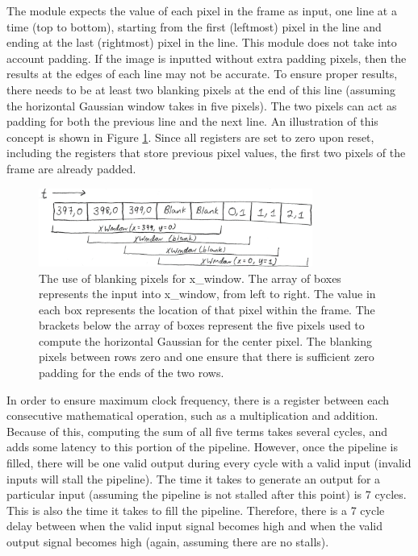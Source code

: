 The module expects the value of each pixel in the frame as input, one line at 
a time (top to bottom), starting from the first (leftmost) pixel in the line and 
ending at the last (rightmost) pixel in the line. This module does not take into 
account padding. If the image is inputted without extra padding pixels, then the 
results at the edges of each line may not be accurate. To ensure proper results, 
there needs to be at least two blanking pixels at the end of this line (assuming 
the horizontal Gaussian window takes in five pixels). The two pixels can act as 
padding for both the previous line and the next line. An illustration of this 
concept is shown in Figure \ref{fig:serial}. Since all registers are set to 
zero upon reset, including the registers that store previous pixel values, the 
first two pixels of the frame are already padded.

\begin{figure}
    \centering
    \includegraphics[width=0.8\textwidth]{processed_image_pngs/serial_input.png}
    \caption{The use of blanking pixels for x\_window. The array of boxes represents the input into x\_window, from left to right. The value in each box represents the location of that pixel within the frame. The brackets below the array of boxes represent the five pixels used to compute the horizontal Gaussian for the center pixel. The blanking pixels between rows zero and one ensure that there is sufficient zero padding for the ends of the two rows.}
    \label{fig:serial}
\end{figure}

In order to ensure maximum clock frequency, there is a register between each 
consecutive mathematical operation, such as a multiplication and addition. 
Because of this, computing the sum of all five terms takes several cycles, and 
adds some latency to this portion of the pipeline. However, once the pipeline is 
filled, there will be one valid output during every cycle with a valid input 
(invalid inputs will stall the pipeline). The time it takes to generate an 
output for a particular input (assuming the pipeline is not stalled after this 
point) is 7 cycles. This is also the time it takes to fill the pipeline. 
Therefore, there is a 7 cycle delay between when the valid input signal becomes 
high and when the valid output signal becomes high (again, assuming there are no 
stalls).

